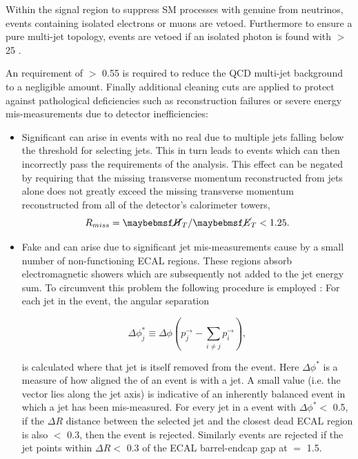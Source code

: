 Within the signal region to suppress \ac{SM} processes with genuine \met from neutrinos, events containing isolated electrons or muons are vetoed. Furthermore to ensure a pure multi-jet topology, events are vetoed if an isolated photon is found with \pt $>$ 25 \GeV. 

An \alphat requirement of $>$ 0.55 is required to reduce the QCD multi-jet background to a negligible amount. Finally additional cleaning cuts are applied to protect against pathological deficiencies such as reconstruction failures or severe energy mis-measurements due to detector inefficiencies:

\begin{itemize}
\item Significant \mht can arise in events with no real \met due to multiple jets falling below the \pt threshold for selecting jets. This in turn leads to events which can then incorrectly pass the \alphat requirements of the analysis. This effect can be negated by requiring that the missing transverse momentum reconstructed from jets alone does not greatly exceed the missing transverse momentum reconstructed from all of the detector's calorimeter towers,
\begin{equation}
R_{miss} = \mht / \met < 1.25. \nonumber
\end{equation}  

\item Fake \met and \mht can arise due to significant jet mis-measurements cause by a small number of non-functioning \ac{ECAL} regions. These regions absorb electromagnetic showers which are subsequently not added to the jet energy sum. To circumvent this problem the following procedure is employed : For each jet in the event, the angular separation

\begin{equation}
\Delta\phi_{j}^{*}\equiv \Delta\phi(p_{j}^{\rightarrow}-\sum_{i\neq j}p_{i}^{\rightarrow}),
\end{equation}

is calculated where that jet is itself removed from the event. Here $\Delta\phi^{*}$ is a measure of how aligned the \mht of an event is with a jet. A small value (i.e. the \mht vector lies along the jet axis) is indicative of an inherently balanced event in which a jet has been mis-measured. For every jet in a event with $\Delta\phi^{*} <$ 0.5, if the $\Delta R$ distance between the selected jet and the closest dead \ac{ECAL} region is also $<$ 0.3, then the event is rejected. Similarly events are rejected if the jet points within $\Delta R <$ 0.3 of the \ac{ECAL} barrel-endcap gap at \abeta $=$ 1.5.

\end{itemize}

